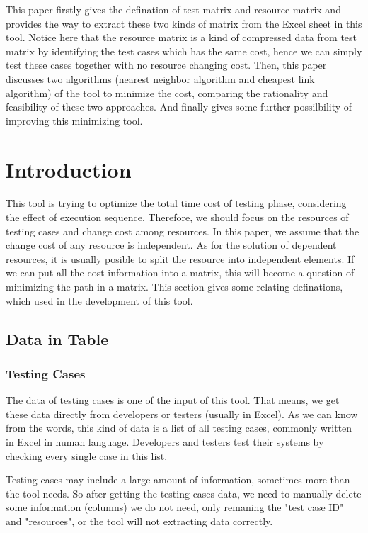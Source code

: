 \documentclass[12pt,a4paper]{article}
\begin{document}
This paper firstly gives the defination of test matrix and resource matrix and provides the way to extract these two kinds of matrix from the Excel sheet in this tool. Notice here that the resource matrix is a kind of compressed data from test matrix by identifying the test cases which has the same cost, hence we can simply test these cases together with no resource changing cost. Then, this paper discusses two algorithms (nearest neighbor algorithm and cheapest link algorithm) of the tool to minimize the cost, comparing the rationality and feasibility of these two approaches. And finally gives some further possilbility of improving this minimizing tool.

\section{Introduction}

This tool is trying to optimize the total time cost of testing phase, considering the effect of execution sequence. Therefore, we should focus on the resources of testing cases and change cost among resources. In this paper, we assume that the change cost of any resource is independent. As for the solution of dependent resources, it is usually posible to split the resource into independent elements. If we can put all the cost information into a matrix, this will become a question of minimizing the path in a matrix. This section gives some relating definations, which used in the development of this tool. 

\subsection{Data in Table}

\subsubsection{Testing Cases}

The data of testing cases is one of the input of this tool. That means, we get these data directly from developers or testers (usually in Excel). As we can know from the words, this kind of data is a list of all testing cases, commonly written in Excel in human language. Developers and testers test their systems by checking every single case in this list.   

Testing cases may include a large amount of information, sometimes more than the tool needs. So after getting the testing cases data, we need to manually delete some information (columns) we do not need, only remaning the "test case ID" and "resources", or the tool will not extracting data correctly.
\end{document}
